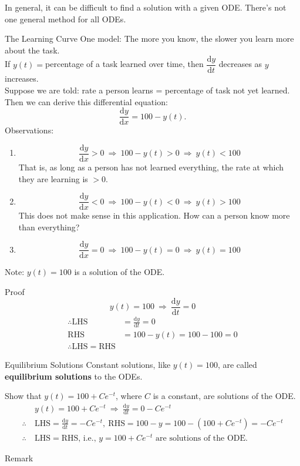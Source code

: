 \documentclass[12pt,a4paper]{article}
\def\d{{\mathrm{d}}}
\begin{document}
In general, it can be difficult to find a solution with a given ODE. There's not one general method for all ODEs. 
\begin{eg}{The Learning Curve}
	One model: The more you know, the slower you learn more about the task. \\
	If $y(t)=$percentage of a task learned over time, then $\dfrac{\d y}{\d t}$ decreases as $y$ increases. \\
	Suppose we are told: rate a person learns = percentage of task not yet learned. Then we can derive this differential equation: $$\frac{\d y}{\d x}=100-y(t).$$
	Observations: 
	\begin{enumerate}
		\item $$\frac{\d y}{\d x}>0\ \Rightarrow\ 100-y(t)>0\ \Rightarrow\ y(t)<100$$ That is, as long as a person has not learned everything, the rate at which they are learning is $>0$.
		\item $$\frac{\d y}{\d x}<0\ \Rightarrow\ 100-y(t)<0\ \Rightarrow\ y(t)>100$$ This does not make sense in this application. How can a person know more than everything? 
		\item $$\frac{\d y}{\d x}=0\ \Rightarrow\ 100-y(t)=0\ \Rightarrow\ y(t)=100$$
	\end{enumerate}
	Note: $y(t)=100$ is a solution of the ODE. 
	\begin{prf}{Proof}
		$$y(t)=100\ \Rightarrow\ \frac{\d y}{\d t}=0$$
		$$\begin{aligned}
			\therefore \text{LHS}&=\frac{\d y}{\d t}=0\\
			\text{RHS}&=100-y(t)=100-100=0\\
			\therefore \text{LHS}=\text{RHS}
		\end{aligned}$$
	\end{prf}
	\begin{df}{Equilibrium Solutions}
		Constant solutions, like $y(t)=100$, are called \textbf{equilibrium solutions} to the ODEs. 
	\end{df}
	Show that $y(t)=100+Ce^{-t}$, where $C$ is a constant, are solutions of the ODE. 
	$$\begin{aligned}
		&y(t)=100+Ce^{-t}\ \Rightarrow\ \frac{\d y}{\d t}=0-Ce^{-t}\\
		\therefore\ &\text{LHS}=\frac{\d y}{\d t}=-Ce^{-t},\ \text{RHS}=100-y=100-\left(100+Ce^{-t}\right)=-Ce^{-t}\\
		\therefore\ &\text{LHS}=\text{RHS}\text{, i.e., }y=100+Ce^{-t}\text{ are solutions of the ODE. }
	\end{aligned}$$
	\begin{rmk}{Remark}

\end{rmk}
\end{eg}
\end{document}
